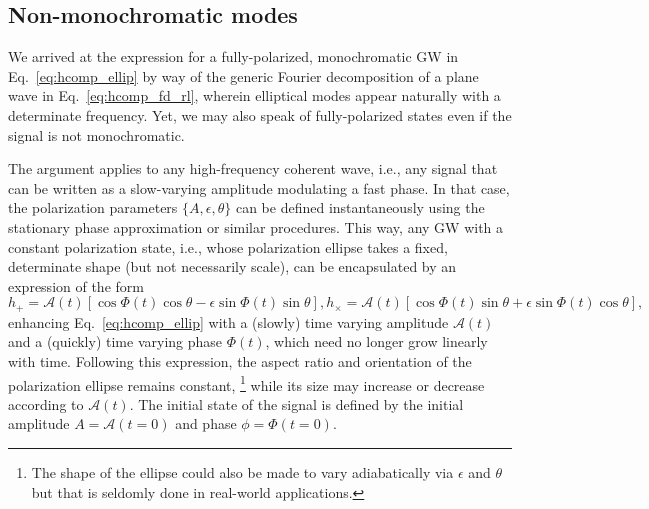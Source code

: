 \documentclass[aps,prd,twocolumn,superscriptaddress,preprintnumbers,floatfix,nofootinbib]{revtex4-2}
\begin{document}
\subsection{Non-monochromatic modes}
\label{sec:ellip:gen}

We arrived at the expression for a fully-polarized, monochromatic GW in Eq.~\eqref{eq:hcomp_ellip} by way of the generic Fourier decomposition of a plane wave in Eq.~\eqref{eq:hcomp_fd_rl}, wherein elliptical modes appear naturally with a determinate frequency.
Yet, we may also speak of fully-polarized states even if the signal is not monochromatic.

The argument applies to any high-frequency coherent wave, i.e., any signal that can be written as a slow-varying amplitude modulating a fast phase.
In that case, the polarization parameters $\{A, \epsilon, \theta\}$ can be defined instantaneously using the stationary phase approximation or similar procedures.
This way, any GW with a constant polarization state, i.e., whose polarization ellipse takes a fixed, determinate shape (but not necessarily scale), can be encapsulated by an expression of the form
\begin{subequations} \label{eq:ellip_gen}
\begin{equation} %
h_+ = \mathcal{A}(t) \left[\cos \Phi(t) \cos \theta - \epsilon \sin \Phi(t) \sin\theta \right] ,
\end{equation}
\begin{equation} %
h_\times = \mathcal{A}(t) \left[ \cos \Phi(t) \sin \theta + \epsilon \sin \Phi(t) \cos\theta \right] ,
\end{equation}
\end{subequations}
enhancing Eq.~\eqref{eq:hcomp_ellip} with a (slowly) time varying amplitude $\mathcal{A}(t)$ and a (quickly) time varying phase $\Phi(t)$, which need no longer grow linearly with time.
Following this expression, the aspect ratio and orientation of the polarization ellipse remains constant,%
\footnote{The shape of the ellipse could also be made to vary adiabatically via $\epsilon$ and $\theta$ but that is seldomly done in real-world applications.}
while its size may increase or decrease according to $\mathcal{A}(t)$.
The initial state of the signal is defined by the initial amplitude $A = \mathcal{A}(t=0)$ and phase $\phi = \Phi(t=0)$.
\end{document}
